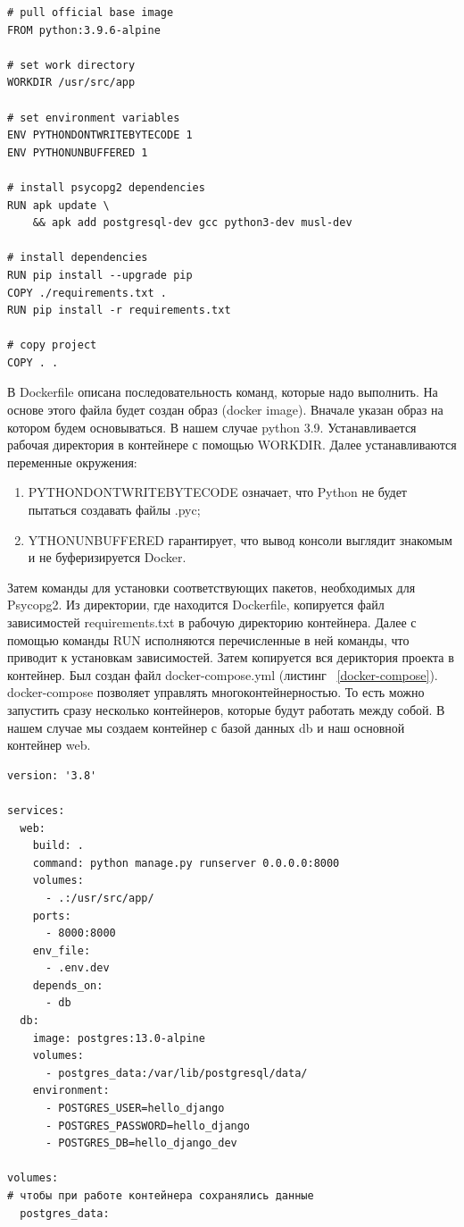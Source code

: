 \begin{lstlisting}[frame=single,label={dockerfile},caption={Dockerfile},language={docker}] 
# pull official base image
FROM python:3.9.6-alpine

# set work directory
WORKDIR /usr/src/app

# set environment variables
ENV PYTHONDONTWRITEBYTECODE 1
ENV PYTHONUNBUFFERED 1

# install psycopg2 dependencies
RUN apk update \
    && apk add postgresql-dev gcc python3-dev musl-dev

# install dependencies
RUN pip install --upgrade pip
COPY ./requirements.txt .
RUN pip install -r requirements.txt

# copy project
COPY . .
\end{lstlisting}

	В \textsf{Dockerfile} описана последовательность команд, которые надо выполнить. На основе этого файла будет создан образ (\textsf{docker image}). Вначале указан образ на котором будем основываться. В нашем случае python 3.9. Устанавливается рабочая директория в контейнере с помощью \textsf{WORKDIR}. Далее устанавливаются переменные окружения:

\begin{enumerate}
	\item \textsf{PYTHONDONTWRITEBYTECODE} означает, что \textsf{Python} не будет пытаться создавать файлы \textsf{.pyc};
	\item \textsf{YTHONUNBUFFERED} гарантирует, что вывод консоли выглядит знакомым и не буферизируется Docker.
\end{enumerate}
	Затем команды для установки соответствующих пакетов, необходимых для \textsf{Psycopg2}. Из директории, где находится \textsf{Dockerfile}, копируется файл зависимостей \textsf{requirements.txt} в рабочую директорию контейнера. Далее с помощью команды \textsf{RUN} исполняются перечисленные в ней команды, что приводит к установкам зависимостей. Затем копируется вся дериктория проекта в контейнер.
	Был создан файл \textsf{docker-compose.yml} (листинг ~\ref{docker-compose}). \textsf{docker-compose} позволяет управлять многоконтейнерностью. То есть можно запустить сразу несколько контейнеров, которые будут работать между собой. В нашем случае мы создаем контейнер с базой данных \textsf{db} и наш основной контейнер \textsf{web}.
\begin{lstlisting}[frame=single, label={docker-compose}, caption={docker-compose.yml}, language={docker-compose}] 
version: '3.8'

services:
  web:
    build: .
    command: python manage.py runserver 0.0.0.0:8000
    volumes:
      - .:/usr/src/app/
    ports:
      - 8000:8000
    env_file:
      - .env.dev
    depends_on:
      - db
  db:
    image: postgres:13.0-alpine
    volumes:
      - postgres_data:/var/lib/postgresql/data/
    environment:
      - POSTGRES_USER=hello_django
      - POSTGRES_PASSWORD=hello_django
      - POSTGRES_DB=hello_django_dev

volumes:
# чтобы при работе контейнера сохранялись данные
  postgres_data:
\end{lstlisting}

